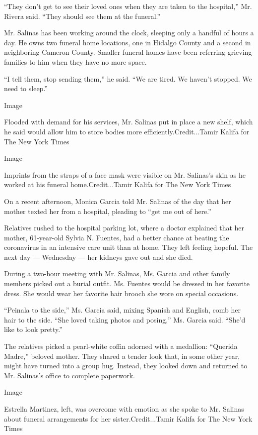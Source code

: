 ``They don't get to see their loved ones when they are taken to the
hospital,'' Mr. Rivera said. ``They should see them at the funeral.''

Mr. Salinas has been working around the clock, sleeping only a handful
of hours a day. He owns two funeral home locations, one in Hidalgo
County and a second in neighboring Cameron County. Smaller funeral homes
have been referring grieving families to him when they have no more
space.

``I tell them, stop sending them,'' he said. ``We are tired. We haven't
stopped. We need to sleep.''

Image

Flooded with demand for his services, Mr. Salinas put in place a new
shelf, which he said would allow him to store bodies more
efficiently.Credit...Tamir Kalifa for The New York Times

Image

Imprints from the straps of a face mask were visible on Mr. Salinas's
skin as he worked at his funeral home.Credit...Tamir Kalifa for The New
York Times

On a recent afternoon, Monica Garcia told Mr. Salinas of the day that
her mother texted her from a hospital, pleading to ``get me out of
here.''

Relatives rushed to the hospital parking lot, where a doctor explained
that her mother, 61-year-old Sylvia N. Fuentes, had a better chance at
beating the coronavirus in an intensive care unit than at home. They
left feeling hopeful. The next day --- Wednesday --- her kidneys gave
out and she died.

During a two-hour meeting with Mr. Salinas, Ms. Garcia and other family
members picked out a burial outfit. Ms. Fuentes would be dressed in her
favorite dress. She would wear her favorite hair brooch she wore on
special occasions.

``Peinala to the side,'' Ms. Garcia said, mixing Spanish and English,
comb her hair to the side. ``She loved taking photos and posing,'' Ms.
Garcia said. ``She'd like to look pretty.''

The relatives picked a pearl-white coffin adorned with a medallion:
``Querida Madre,'' beloved mother. They shared a tender look that, in
some other year, might have turned into a group hug. Instead, they
looked down and returned to Mr. Salinas's office to complete paperwork.

Image

Estrella Martinez, left, was overcome with emotion as she spoke to Mr.
Salinas about funeral arrangements for her sister.Credit...Tamir Kalifa
for The New York Times

